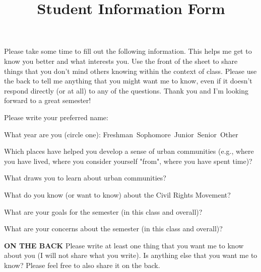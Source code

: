 \documentclass[11pt]{homework}
\title{Student Information Form}
\begin{document}
\maketitle 

\noindent Please take some time to fill out the following information. This helps me get to know you better and what interests you. Use the front of the sheet to share things that you don't mind others knowing within the context of class. Please use the back to tell me anything that you might want me to know, even if it doesn't respond directly (or at all) to any of the questions. Thank you and I'm looking forward to a great semester!


\begin{questions}
\question Please write your preferred name:

\question What year are you (circle one): Freshman\, Sophomore\, Junior\, Senior\, Other


\question Which places have helped you develop a sense of urban communities (e.g., where you have lived, where you consider yourself "from", where you have spent time)? 
\begin{solution}[.5in]\end{solution}

\question What draws you to learn about urban communities?
\begin{solution}[.5in]\end{solution}

\question What do you know (or want to know) about the Civil Rights Movement?
\begin{solution}[.5in]\end{solution}

\question What are your goals for the semester (in this class and overall)? 
\begin{solution}[.5in]\end{solution}

\question What are your concerns about the semester (in this class and overall)?
\begin{solution}[.5in]\end{solution}

\question \textbf{ON THE BACK} Please write at least one thing that you want me to know about you (I will not share what you write). Is anything else that you want me to know? Please feel free to also share it on the back.

\end{questions}
\end{document}
